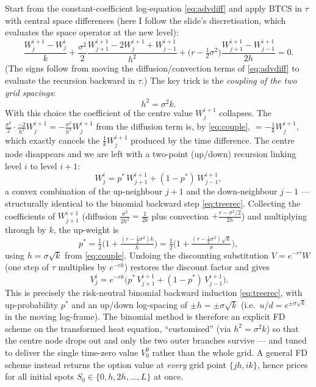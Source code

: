 \documentclass[11pt]{article}
\begin{document}
Start from the constant-coefficient log-equation \eqref{eq:advdiff} and apply BTCS in $\tau$ with central space differences (here I follow the slide's discretisation, which evaluates the space operator at the new level):
\begin{equation}
\frac{W^{i+1}_j-W^i_j}{k} + \frac{\sigma^2}{2}\frac{W^{i+1}_{j+1}-2W^{i+1}_j+W^{i+1}_{j-1}}{h^2}
+ \Big(r-\tfrac12\sigma^2\Big)\frac{W^{i+1}_{j+1}-W^{i+1}_{j-1}}{2h} = 0 .
\label{eq:btcsW}
\end{equation}
(The signs follow from moving the diffusion/convection terms of \eqref{eq:advdiff} to evaluate the recursion backward in $\tau$.) The key trick is the \emph{coupling of the two grid spacings}:
\begin{equation}
h^2 = \sigma^2 k .
\label{eq:couple}
\end{equation}
With this choice the coefficient of the centre value $W^{i+1}_j$ collapses. The $\tfrac{\sigma^2}{2}\cdot\tfrac{-2}{h^2}W^{i+1}_j = -\tfrac{\sigma^2}{h^2}W^{i+1}_j$ from the diffusion term is, by \eqref{eq:couple}, $=-\tfrac{1}{k}W^{i+1}_j$, which exactly cancels the $\tfrac{1}{k}W^{i+1}_j$ produced by the time difference. The centre node disappears and we are left with a two-point (up/down) recursion linking level $i$ to level $i{+}1$:
\begin{equation}
W^i_j = p^\ast\,W^{i+1}_{j+1} + (1-p^\ast)\,W^{i+1}_{j-1},
\label{eq:Wrec}
\end{equation}
a convex combination of the up-neighbour $j{+}1$ and the down-neighbour $j{-}1$ --- structurally identical to the binomial backward step \eqref{eq:treerec}. Collecting the coefficients of $W^{i+1}_{j+1}$ (diffusion $\tfrac{\sigma^2}{2h^2}=\tfrac{1}{2k}$ plus convection $+\tfrac{r-\sigma^2/2}{2h}$) and multiplying through by $k$, the up-weight is
\begin{equation}
p^\ast = \tfrac12\Big(1 + \tfrac{(r-\tfrac12\sigma^2)k}{h}\Big)
= \tfrac12\Big(1 + \tfrac{(r-\tfrac12\sigma^2)\sqrt{k}}{\sigma}\Big),
\label{eq:pstar}
\end{equation}
using $h=\sigma\sqrt k$ from \eqref{eq:couple}. Undoing the discounting substitution $V=e^{-r\tau}W$ (one step of $\tau$ multiplies by $e^{-rk}$) restores the discount factor and gives
\begin{equation}
\boxed{\,V^i_j = e^{-rk}\big(p^\ast\,V^{i+1}_{j+1} + (1-p^\ast)\,V^{i+1}_{j-1}\big).}
\label{eq:VrecFD}
\end{equation}
This is precisely the risk-neutral binomial backward induction \eqref{eq:treerec}, with up-probability $p^\ast$ and an up/down log-spacing of $\pm h=\pm\sigma\sqrt k$ (i.e.\ $u/d = e^{\pm\sigma\sqrt k}$ in the moving log-frame). The binomial method is therefore an explicit FD scheme on the transformed heat equation, ``customised'' (via $h^2=\sigma^2 k$) so that the centre node drops out and only the two outer branches survive --- and tuned to deliver the single time-zero value $V^0_0$ rather than the whole grid. A general FD scheme instead returns the option value at \emph{every} grid point $\{jh,ik\}$, hence prices for all initial spots $S_0\in\{0,h,2h,\dots,L\}$ at once.
\end{document}
